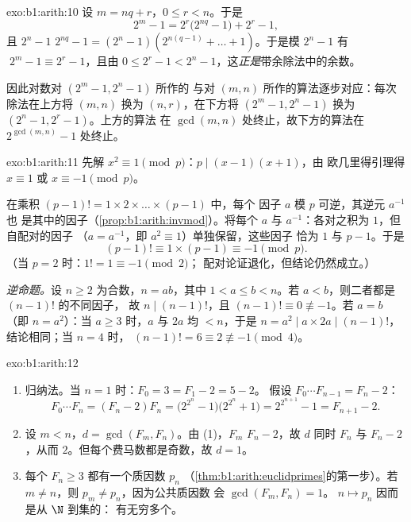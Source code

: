 \begin{solution}{exo:b1:arith:10}
设 $m = nq + r$，$0 \leq r < n$。于是
\[
2^m - 1 = 2^r\bigl(2^{nq} - 1\bigr) + 2^r - 1,
\]
且 $2^n - 1$  $2^{nq} - 1 = (2^n - 1)(2^{n(q-1)} + \dots +
1)$。于是模 $2^n - 1$ 有 $\;2^m - 1 \equiv 2^r - 1$，且由 $0 \leq
2^r - 1 < 2^n - 1$，这\emph{正是}带余除法中的余数。

因此对数对 $(2^m - 1, 2^n - 1)$ 所作的
与对 $(m, n)$ 所作的算法逐步对应：每次
除法在上方将 $(m, n)$ 换为 $(n, r)$，在下方将 $(2^m - 1,
2^n - 1)$ 换为 $(2^n - 1, 2^r - 1)$。上方的算法
在 $\gcd(m,n)$ 处终止，故下方的算法在
$2^{\gcd(m,n)} - 1$ 处终止。
\end{solution}

\begin{solution}{exo:b1:arith:11}
先解 $x^2 \equiv 1 \pmod p$：$p \mid (x-1)(x+1)$，由
欧几里得引理得 $x \equiv 1$ 或 $x \equiv -1 \pmod p$。

在乘积 $(p-1)! = 1 \times 2 \times \dots \times (p-1)$ 中，每个
因子 $a$ 模 $p$ 可逆，其逆元 $a^{-1}$ 也
是其中的因子（\cref{prop:b1:arith:invmod}）。将每个 $a$ 与
$a^{-1}$：各对之积为 $1$，但自配对的因子
（$a = a^{-1}$，即 $a^2 \equiv 1$）单独保留，这些因子
恰为 $1$ 与 $p - 1$。于是
\[
(p-1)! \equiv 1 \times (p - 1) \equiv -1 \pmod p .
\]
（当 $p = 2$ 时：$1! = 1 \equiv -1 \pmod 2$；
配对论证退化，但结论仍然成立。）

\emph{逆命题。}设 $n \geq 2$ 为合数，$n = ab$，其中 $1 < a
\leq b < n$。若 $a < b$，则二者都是 $(n-1)!$ 的不同因子，
故 $n \mid (n-1)!$，且 $(n-1)! \equiv 0 \not\equiv -1$。若 $a = b$
（即 $n = a^2$）：当 $a \geq 3$ 时，$a$ 与 $2a$ 均 $< n$，于是
$n = a^2 \mid a \times 2a \mid (n-1)!$，结论相同；当 $n = 4$ 时，
$(n-1)! = 6 \equiv 2 \not\equiv -1 \pmod 4$。
\end{solution}

\begin{solution}{exo:b1:arith:12}
\begin{enumerate}
  \item 归纳法。当 $n = 1$ 时：$F_0 = 3 = F_1 - 2 = 5 - 2$。
        假设 $F_0\cdots F_{n-1} = F_n - 2$：
        \[
        F_0 \cdots F_n = (F_n - 2)F_n
        = \bigl(2^{2^n} - 1\bigr)\bigl(2^{2^n} + 1\bigr)
        = 2^{2^{n+1}} - 1 = F_{n+1} - 2 .
        \]
  \item 设 $m < n$，$d = \gcd(F_m, F_n)$。由 (1)，$F_m$
         $F_n - 2$，故 $d$ 同时 $F_n$ 与 $F_n -
        2$，从而 $2$。但每个费马数都是奇数，故
        $d = 1$。
  \item 每个 $F_n \geq 3$ 都有一个质因数 $p_n$
        （\cref{thm:b1:arith:euclidprimes}的第一步）。若 $m
        \neq n$，则 $p_m \neq p_n$，因为公共质因数
        会 $\gcd(F_m, F_n) = 1$。 $n \mapsto p_n$
        因而是从 $\N$ 到集的：
        有无穷多个。
\end{enumerate}
\end{solution}

